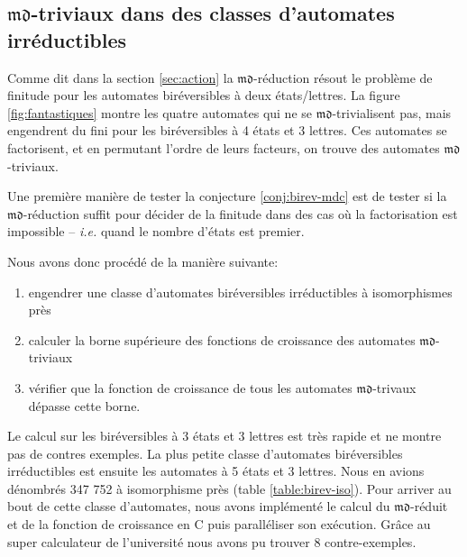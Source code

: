 \documentclass[11pt,a4paper]{article}
\begin{document}
\subsection{$\mathfrak{md}$-triviaux dans des classes d'automates irréductibles}

Comme dit dans la section \ref{sec:action} la $\mathfrak{md}$-réduction résout le problème de finitude pour les automates biréversibles à deux états/lettres. La figure \ref{fig:fantastiques} montre les quatre automates qui ne se $\mathfrak{md}$-trivialisent pas, mais engendrent du fini pour les biréversibles à 4 états et 3 lettres. Ces automates se factorisent, et en permutant l'ordre de leurs facteurs, on trouve des automates $\mathfrak{md}$-triviaux.

Une première manière de tester la conjecture \ref{conj:birev-mdc} est de tester si la $\mathfrak{md}$-réduction suffit pour décider de la finitude dans des cas où la factorisation est impossible -- \emph{i.e.} quand le nombre d'états est premier.

Nous avons donc procédé de la manière suivante:

\begin{enumerate}
\item engendrer une classe d'automates biréversibles irréductibles à isomorphismes près
\item calculer la borne supérieure des fonctions de croissance des automates $\mathfrak{md}$-triviaux
\item vérifier que la fonction de croissance de tous les automates $\mathfrak{md}$-trivaux dépasse cette borne.
\end{enumerate}

Le calcul sur les biréversibles à 3 états et 3 lettres est très rapide et ne montre pas de contres exemples. La plus petite classe d'automates biréversibles irréductibles est ensuite les automates à 5 états et 3 lettres. Nous en avions dénombrés 347 752 à isomorphisme près (table \ref{table:birev-iso}). Pour arriver au bout de cette classe d'automates, nous avons implémenté le calcul du $\mathfrak{md}$-réduit et de la fonction de croissance en C puis paralléliser son exécution. Grâce au super calculateur de l'université nous avons pu trouver 8 contre-exemples.
\end{document}
